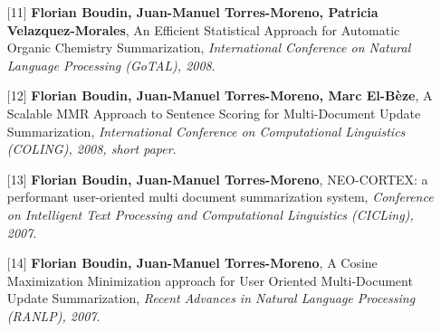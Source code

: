 \documentclass[11pt,a4paper]{moderncv}
\begin{document}
\begin{itemize}[leftmargin=1.2cm,itemsep=0.1cm]
        \item[{\small$[$11$]$}] \textbf{Florian Boudin, Juan-Manuel Torres-Moreno, Patricia Velazquez-Morales}, An Efficient Statistical Approach for Automatic Organic Chemistry Summarization, \textit{International Conference on Natural Language Processing (GoTAL), 2008}.
        \item[{\small$[$12$]$}] \textbf{Florian Boudin, Juan-Manuel Torres-Moreno, Marc El-Bèze}, A Scalable MMR Approach to Sentence Scoring for Multi-Document Update Summarization, \textit{International Conference on Computational Linguistics (COLING), 2008, short paper}.
        \item[{\small$[$13$]$}] \textbf{Florian Boudin, Juan-Manuel Torres-Moreno}, NEO-CORTEX: a performant user-oriented multi document summarization system, \textit{Conference on Intelligent Text Processing and Computational Linguistics (CICLing), 2007}.
        \item[{\small$[$14$]$}] \textbf{Florian Boudin, Juan-Manuel Torres-Moreno}, A Cosine Maximization Minimization approach for User Oriented Multi-Document Update Summarization, \textit{Recent Advances in Natural Language Processing (RANLP), 2007}.
    \end{itemize}
\end{document}
